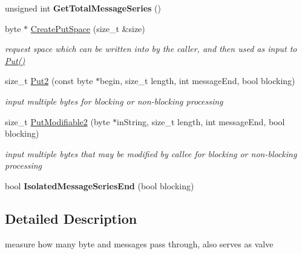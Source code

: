 \begin{DoxyCompactItemize}
\item 
\hypertarget{class_meter_filter_a669934f985f8861e5d27e3e9377ce45c}{
unsigned int {\bfseries GetTotalMessageSeries} ()}
\label{class_meter_filter_a669934f985f8861e5d27e3e9377ce45c}

\item 
byte $\ast$ \hyperlink{class_meter_filter_a49d92192dcbd3366ff0576159ea62e9d}{CreatePutSpace} (size\_\-t \&size)
\begin{DoxyCompactList}\small\item\em request space which can be written into by the caller, and then used as input to \hyperlink{class_buffered_transformation_ae70658b0d271f8e114ac6c3cc9774ede}{Put()} \item\end{DoxyCompactList}\item 
size\_\-t \hyperlink{class_meter_filter_ac85bac20a08666c434751558ec7b6c92}{Put2} (const byte $\ast$begin, size\_\-t length, int messageEnd, bool blocking)
\begin{DoxyCompactList}\small\item\em input multiple bytes for blocking or non-\/blocking processing \item\end{DoxyCompactList}\item 
size\_\-t \hyperlink{class_meter_filter_a03c8af7442aa844e83e4c45397373f14}{PutModifiable2} (byte $\ast$inString, size\_\-t length, int messageEnd, bool blocking)
\begin{DoxyCompactList}\small\item\em input multiple bytes that may be modified by callee for blocking or non-\/blocking processing \item\end{DoxyCompactList}\item 
\hypertarget{class_meter_filter_aa3b923710e4ed83fb4980cb53504a521}{
bool {\bfseries IsolatedMessageSeriesEnd} (bool blocking)}
\label{class_meter_filter_aa3b923710e4ed83fb4980cb53504a521}

\end{DoxyCompactItemize}


\subsection{Detailed Description}
measure how many byte and messages pass through, also serves as valve 

